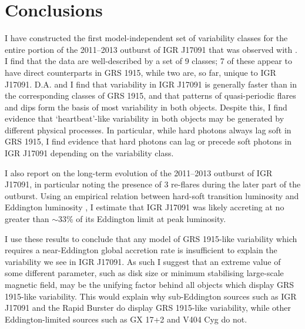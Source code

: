 \section{Conclusions}

\par I have constructed the first model-independent set of variability classes for the entire portion of the 2011--2013 outburst of IGR J17091 that was observed with \rxte .  I find that the data are well-described by a set of 9 classes;  7 of these appear to have direct counterparts in GRS 1915, while two are, so far, unique to IGR J17091.  \textsf{D.A.} and I find that variability in IGR J17091 is generally faster than in the corresponding classes of GRS 1915, and that patterns of quasi-periodic flares and dips form the basis of most variability in both objects.  Despite this, I find evidence that `heartbeat'-like variability in both objects may be generated by different physical processes.  In particular, while hard photons always lag soft in GRS 1915, I find evidence that hard photons can lag or precede soft photons in IGR J17091 depending on the variability class.
\par I also report on the long-term evolution of the 2011--2013 outburst of IGR J17091, in particular noting the presence of 3 re-flares during the later part of the outburst.  Using an empirical relation between hard-soft transition luminosity and Eddington luminosity \citep{Maccarone_2pct}, I estimate that IGR J17091 was likely accreting at no greater than $\sim33$\% of its Eddington limit at peak luminosity.
\par I use these results to conclude that any model of GRS 1915-like variability which requires a near-Eddington global accretion rate is insufficient to explain the variability we see in IGR J17091.  As such I suggest that an extreme value of some different parameter, such as disk size or minimum stabilising large-scale magnetic field, may be the unifying factor behind all objects which display GRS 1915-like variability.  This would explain why sub-Eddington sources such as IGR J17091 and the Rapid Burster do display GRS 1915-like variability, while other Eddington-limited sources such as GX 17+2 and V404 Cyg do not.